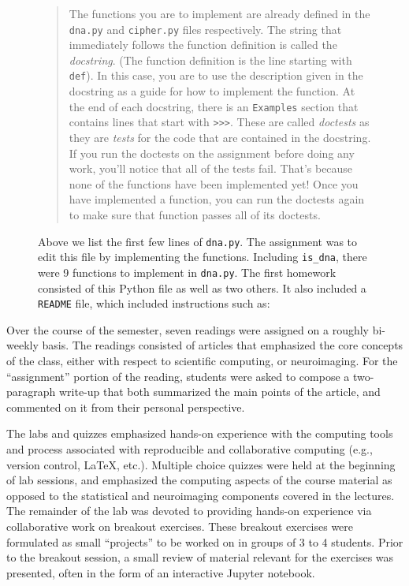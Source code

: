 
\begin{figure}
\centering

\caption{Above we list the first few lines of \texttt{dna.py}.
The assignment was to edit this file by implementing the functions.
Including \texttt{is\_dna}, there were 9 functions
to implement in \texttt{dna.py}.
The first homework consisted of this Python file as well as two others.
It also included a \texttt{README} file, which included instructions
such as:}\label{fig:dna}
\begin{quotation}
The functions you are to implement are already defined in the \texttt{dna.py} and
\texttt{cipher.py} files respectively. The string that immediately follows the function
definition is called the \emph{docstring}. (The function definition is the line
starting with \texttt{def}). In this case, you are to use the description given in the
docstring as a guide for how to implement the function. At the end of each
docstring, there is an \texttt{Examples} section that contains lines that start with
\verb|>>>|. These are called \emph{doctests} as they are \emph{tests} for the code that are
contained in the docstring. If you run the doctests on the assignment before
doing any work, you'll notice that all of the tests fail. That's because none
of the functions have been implemented yet! Once you have implemented a
function, you can run the doctests again to make sure that function passes all
of its doctests.
\end{quotation}
\end{figure}

Over the course of the semester, seven readings were assigned on a roughly
bi-weekly basis.
The readings consisted of articles that emphasized the core concepts
of the class, either with respect to scientific computing, or neuroimaging.
For the ``assignment'' portion of the reading, students were asked to compose
a two-paragraph write-up that both summarized the main points of the article,
and commented on it from their personal perspective.

The labs and quizzes emphasized hands-on experience with the computing tools
and process associated with reproducible and collaborative computing (e.g.,
version control, \LaTeX, etc.).
Multiple choice quizzes were held at the beginning of lab sessions, and
emphasized the computing aspects of the course material as
opposed to the statistical and neuroimaging components covered in the lectures.
The remainder of the lab was devoted to providing hands-on experience via
collaborative work on breakout exercises.
These breakout exercises were formulated as small ``projects'' to be worked on
in groups of 3 to 4 students.
Prior to the breakout session, a small review of material relevant for the 
exercises was presented, often in the form of an interactive Jupyter notebook.

